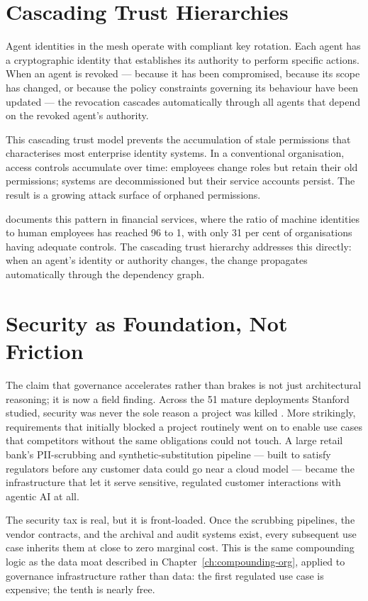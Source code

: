 \section{Cascading Trust Hierarchies}

Agent identities in the mesh operate with compliant key rotation. Each agent has a cryptographic identity that establishes its authority to perform specific actions. When an agent is revoked --- because it has been compromised, because its scope has changed, or because the policy constraints governing its behaviour have been updated --- the revocation cascades automatically through all agents that depend on the revoked agent's authority.

This cascading trust model prevents the accumulation of stale permissions that characterises most enterprise identity systems. In a conventional organisation, access controls accumulate over time: employees change roles but retain their old permissions; systems are decommissioned but their service accounts persist. The result is a growing attack surface of orphaned permissions.

\textcite{CyberArk2025} documents this pattern in financial services, where the ratio of machine identities to human employees has reached 96 to 1, with only 31 per cent of organisations having adequate controls. The cascading trust hierarchy addresses this directly: when an agent's identity or authority changes, the change propagates automatically through the dependency graph.

\section{Security as Foundation, Not Friction}

The claim that governance accelerates rather than brakes is not just architectural reasoning; it is now a field finding. Across the 51 mature deployments Stanford studied, security was never the sole reason a project was killed \parencite{Pereira2026Playbook}. More strikingly, requirements that initially blocked a project routinely went on to enable use cases that competitors without the same obligations could not touch. A large retail bank's PII-scrubbing and synthetic-substitution pipeline --- built to satisfy regulators before any customer data could go near a cloud model --- became the infrastructure that let it serve sensitive, regulated customer interactions with agentic AI at all.

The security tax is real, but it is front-loaded. Once the scrubbing pipelines, the vendor contracts, and the archival and audit systems exist, every subsequent use case inherits them at close to zero marginal cost. This is the same compounding logic as the data moat described in Chapter~\ref{ch:compounding-org}, applied to governance infrastructure rather than data: the first regulated use case is expensive; the tenth is nearly free.

